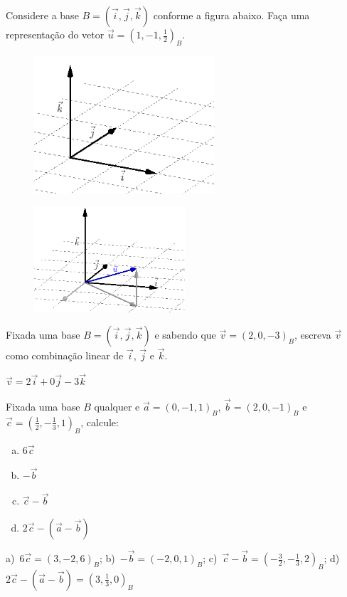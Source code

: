 \begin{exer}
  Considere a base $B=(\vec{i}, \vec{j}, \vec{k})$ conforme a figura abaixo. Faça uma representação do vetor $\vec{u}=\left(1,-1,\frac{1}{2}\right)_B$.  
  \begin{figure}[H]
    \centering
    \includegraphics[width=0.6\textwidth]{cap_base/dados/fig_sec_base/repr_geo_exer}
  \end{figure}
\end{exer}
\begin{resp}
  \begin{figure}[H]
    \centering
    \includegraphics[width=0.5\textwidth]{cap_base/dados/fig_sec_base/repr_geo_resp}
  \end{figure}  
\end{resp}

\begin{exer}
  Fixada uma base $B=(\vec{i},\vec{j},\vec{k})$ e sabendo que $\vec{v}=(2,0,-3)_B$, escreva $\vec{v}$ como combinação linear de $\vec{i}$, $\vec{j}$ e $\vec{k}$.
\end{exer}
\begin{resp}
  $\vec{v}=2\vec{i}+0\vec{j}-3\vec{k}$
\end{resp}

\begin{exer}
  Fixada uma base $B$ qualquer e $\vec{a}=\left(0,-1,1\right)_B$, $\vec{b}=\left(2,0,-1\right)_B$ e $\vec{c}=\left(\frac{1}{2},-\frac{1}{3},1\right)_B$, calcule:
  \begin{enumerate}[a)]
  \item $6\vec{c}$
  \item $-\vec{b}$
  \item $\vec{c}-\vec{b}$
  \item $2\vec{c}-(\vec{a}-\vec{b})$
  \end{enumerate}
\end{exer}
\begin{resp}
  a)~$6\vec{c}=(3,-2,6)_B$; b)~$-\vec{b}=(-2,0,1)_B$; c)~$\vec{c}-\vec{b}=(-\frac{3}{2},-\frac{1}{3},2)_B$; d)~$2\vec{c}-(\vec{a}-\vec{b})=(3,\frac{1}{3},0)_B$
\end{resp}

